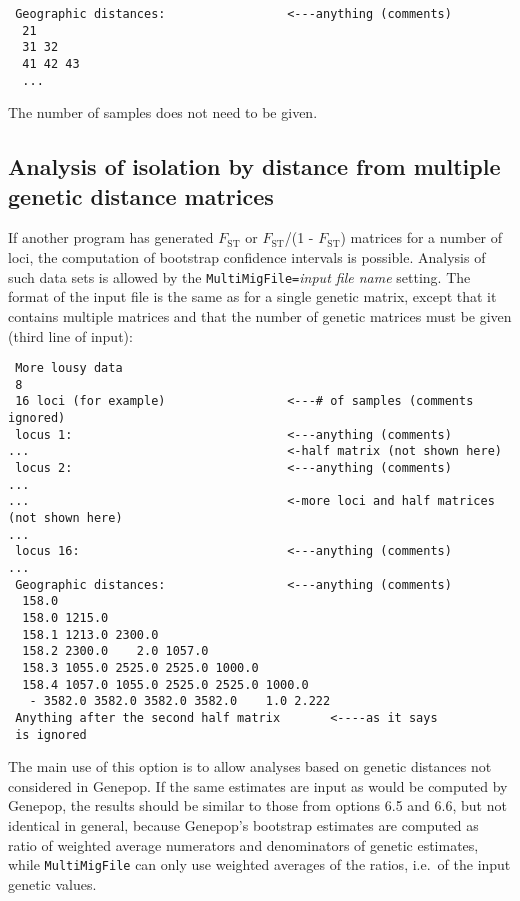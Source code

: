 \documentclass[12pt,]{book}
\begin{document}
\begin{verbatim}
 Geographic distances:                 <---anything (comments)
  21
  31 32
  41 42 43
  ...
\end{verbatim}

The number of samples does not need to be given.

\subsection{Analysis of isolation by distance from multiple genetic
distance
matrices}\label{analysis-of-isolation-by-distance-from-multiple-genetic-distance-matrices}

If another program has generated \(F_{\mathrm{ST}}\) or
\(F_{\mathrm{ST}}\)/(1 - \(F_{\mathrm{ST}}\)) matrices for a number of
loci, the computation of bootstrap confidence intervals is possible.
Analysis of such data sets is allowed by the
\texttt{MultiMigFile=}\emph{input file name}
setting. The format of the input file is the
same as for a single genetic matrix, except that it contains multiple
matrices and that the number of genetic matrices must be given (third
line of input):

\begin{verbatim}
 More lousy data
 8
 16 loci (for example)                 <---# of samples (comments ignored)
 locus 1:                              <---anything (comments)
...                                    <-half matrix (not shown here)
 locus 2:                              <---anything (comments)
...
...                                    <-more loci and half matrices (not shown here)
...
 locus 16:                             <---anything (comments)
...
 Geographic distances:                 <---anything (comments)
  158.0
  158.0 1215.0
  158.1 1213.0 2300.0
  158.2 2300.0    2.0 1057.0
  158.3 1055.0 2525.0 2525.0 1000.0
  158.4 1057.0 1055.0 2525.0 2525.0 1000.0
   - 3582.0 3582.0 3582.0 3582.0    1.0 2.222
 Anything after the second half matrix       <----as it says
 is ignored
\end{verbatim}

The main use of this option is to allow analyses based on genetic
distances not considered in Genepop. If the same estimates are input as
would be computed by Genepop, the results should be similar to those
from options 6.5 and 6.6, but not identical in general, because
Genepop's bootstrap estimates are computed as ratio of weighted average
numerators and denominators of genetic estimates, while
\texttt{MultiMigFile} can only use weighted averages of the ratios,
i.e.~of the input genetic values.
\end{document}
